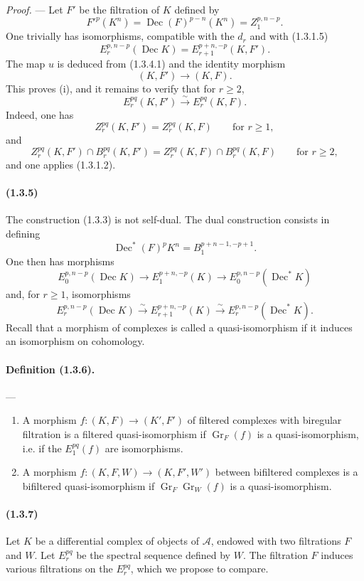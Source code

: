 \documentclass[10pt]{article}
\newcommand{\Gr}{\operatorname{Gr}}
\newcommand{\calA}{\mathcal A}
\newcommand{\iso}{\xrightarrow{\sim}}
\newcommand{\Dec}{\operatorname{Dec}}
\begin{document}
\emph{Proof.} --- Let $F'$ be the filtration of $K$ defined by
\[
F'^p(K^n)=\Dec(F)^{p-n}(K^n)=Z_1^{p,n-p}.
\]
One trivially has isomorphisms, compatible with the $d_r$ and with (1.3.1.5)
\[
\tag{1.3.4.1}
E_r^{p,n-p}(\Dec K)=E_{r+1}^{p+n,-p}(K,F').
\]
The map $u$ is deduced from (1.3.4.1) and the identity morphism
\[
(K,F')\longrightarrow(K,F).
\]
This proves (i), and it remains to verify that for $r\ge2$,
\[
E_r^{pq}(K,F')\iso E_r^{pq}(K,F).
\]
Indeed, one has
\[
Z_r^{pq}(K,F')=Z_r^{pq}(K,F)\qquad\text{for }r\ge1,
\]
and
\[
Z_r^{pq}(K,F')\cap B_r^{pq}(K,F')=Z_r^{pq}(K,F)\cap B_r^{pq}(K,F)\qquad\text{for }r\ge2,
\]
and one applies (1.3.1.2).

\paragraph{(1.3.5)} The construction (1.3.3) is not self-dual. The dual construction consists in defining
\[
\Dec^*(F)^pK^n=B_1^{p+n-1,-p+1}.
\]
One then has morphisms
\[
E_0^{p,n-p}(\Dec K)\longrightarrow E_1^{p+n,-p}(K)\longrightarrow E_0^{p,n-p}(\Dec^*K)
\]
and, for $r\ge1$, isomorphisms
\[
E_r^{p,n-p}(\Dec K)\iso E_{r+1}^{p+n,-p}(K)\iso E_r^{p,n-p}(\Dec^*K).
\]
Recall that a morphism of complexes is called a quasi-isomorphism if it induces an isomorphism on cohomology.

\paragraph{Definition (1.3.6).} ---
\begin{enumerate}[label=(\roman*)]
\item A morphism $f:(K,F)\to(K',F')$ of filtered complexes with biregular filtration is a filtered quasi-isomorphism if $\Gr_F(f)$ is a quasi-isomorphism, i.e. if the $E_1^{pq}(f)$ are isomorphisms.
\item A morphism $f:(K,F,W)\to(K,F',W')$ between bifiltered complexes is a bifiltered quasi-isomorphism if $\Gr_F\Gr_W(f)$ is a quasi-isomorphism.
\end{enumerate}

\paragraph{(1.3.7)} Let $K$ be a differential complex of objects of $\calA$, endowed with two filtrations $F$ and $W$. Let $E_r^{pq}$ be the spectral sequence defined by $W$. The filtration $F$ induces various filtrations on the $E_r^{pq}$, which we propose to compare.
\end{document}
